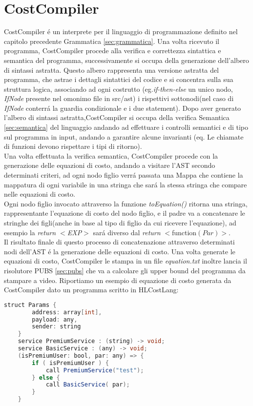 \documentclass[../../main.tex]{subfiles}
\begin{document}
\chapter{CostCompiler}
CostCompiler é un interprete per il linguaggio di programmazione definito nel capitolo precedente Grammatica \ref{sec:grammatica}. Una volta ricevuto il programma, CostCompiler procede alla verifica e correttezza sintattica e semantica del programma, successivamente si occupa della generazione dell'albero di sintassi astratta. 
Questo albero rappresenta una versione astratta del programma, che astrae i dettagli sintattici del codice e si concentra sulla sua struttura logica, associando ad ogni costrutto (eg.\textit{if-then-else} un unico nodo, \textit{IfNode} presente nel omonimo file in src/ast) i rispettivi sottonodi(nel caso di \textit{IfNode} conterrá la guardia condizionale e i due statement).
Dopo aver generato l'albero di sintassi astratta,CostCompiler si occupa della verifica Semantica \ref{sec:semantica} del linguaggio andando ad effettuare i controlli semantici e di tipo sul programma in input, andando a garantire alcune invarianti (eq. Le chiamate di funzioni devono rispettare i tipi di ritorno).\\
Una volta effettuata la verifica semantica, CostCompiler procede con la generazione delle equazioni di costo, andando a visitare l'AST secondo determinati criteri, ad ogni nodo figlio verrá passata una Mappa che contiene la mappatura di ogni variabile in una stringa che sará la stessa stringa che compare nelle equazioni di costo.\\
Ogni nodo figlio invocato attraverso la funzione \textit{toEquation()} ritorna una stringa, rappresentante l'equazione di costo del nodo figlio, e il padre va a concatenare le stringhe dei figli(anche in base al tipo di figlio da cui ricevere l'equazione), ad esempio la \textit{return $<$EXP$>$ } sará diverso dal \textit{return }$<$function$(Par)>$.\\
Il risultato finale di questo processo di concatenazione attraverso determinati nodi dell'AST é la generazione delle equazioni di costo. 
Una volta generate le equazioni di costo, CostCompiler le stampa in un file \textit{equation.txt} inoltre lancia il risolutore PUBS \ref{sec:pubs} che va a calcolare gli upper bound del programma da stampare a video.
Riportiamo un esempio di equazione di costo generata da CostCompiler dato un programma scritto in HLCostLang:
    \begin{lstlisting}[language=Java, caption={Listing8}]
    struct Params {
        address: array[int],
        payload: any,
        sender: string
    }
    service PremiumService : (string) -> void;
    service BasicService : (any) -> void;
    (isPremiumUser: bool, par: any) => {
        if ( isPremiumUser ) {
            call PremiumService("test");
        } else {
            call BasicService( par);
        }
    }
\end{lstlisting}
\end{document}
